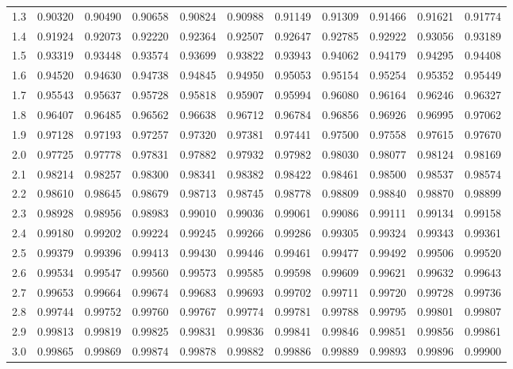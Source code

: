 \begin{center}
\begin{tabular}{c|cccccccccc}
1.3 & 0.90320 & 0.90490 & 0.90658 & 0.90824 & 0.90988 & 0.91149 & 0.91309 & 0.91466 & 0.91621 & 0.91774 \\
1.4 & 0.91924 & 0.92073 & 0.92220 & 0.92364 & 0.92507 & 0.92647 & 0.92785 & 0.92922 & 0.93056 & 0.93189 \\
1.5 & 0.93319 & 0.93448 & 0.93574 & 0.93699 & 0.93822 & 0.93943 & 0.94062 & 0.94179 & 0.94295 & 0.94408 \\
1.6 & 0.94520 & 0.94630 & 0.94738 & 0.94845 & 0.94950 & 0.95053 & 0.95154 & 0.95254 & 0.95352 & 0.95449 \\
1.7 & 0.95543 & 0.95637 & 0.95728 & 0.95818 & 0.95907 & 0.95994 & 0.96080 & 0.96164 & 0.96246 & 0.96327 \\
1.8 & 0.96407 & 0.96485 & 0.96562 & 0.96638 & 0.96712 & 0.96784 & 0.96856 & 0.96926 & 0.96995 & 0.97062 \\
1.9 & 0.97128 & 0.97193 & 0.97257 & 0.97320 & 0.97381 & 0.97441 & 0.97500 & 0.97558 & 0.97615 & 0.97670 \\
2.0 & 0.97725 & 0.97778 & 0.97831 & 0.97882 & 0.97932 & 0.97982 & 0.98030 & 0.98077 & 0.98124 & 0.98169 \\
2.1 & 0.98214 & 0.98257 & 0.98300 & 0.98341 & 0.98382 & 0.98422 & 0.98461 & 0.98500 & 0.98537 & 0.98574 \\
2.2 & 0.98610 & 0.98645 & 0.98679 & 0.98713 & 0.98745 & 0.98778 & 0.98809 & 0.98840 & 0.98870 & 0.98899 \\
2.3 & 0.98928 & 0.98956 & 0.98983 & 0.99010 & 0.99036 & 0.99061 & 0.99086 & 0.99111 & 0.99134 & 0.99158 \\
2.4 & 0.99180 & 0.99202 & 0.99224 & 0.99245 & 0.99266 & 0.99286 & 0.99305 & 0.99324 & 0.99343 & 0.99361 \\
2.5 & 0.99379 & 0.99396 & 0.99413 & 0.99430 & 0.99446 & 0.99461 & 0.99477 & 0.99492 & 0.99506 & 0.99520 \\
2.6 & 0.99534 & 0.99547 & 0.99560 & 0.99573 & 0.99585 & 0.99598 & 0.99609 & 0.99621 & 0.99632 & 0.99643 \\
2.7 & 0.99653 & 0.99664 & 0.99674 & 0.99683 & 0.99693 & 0.99702 & 0.99711 & 0.99720 & 0.99728 & 0.99736 \\
2.8 & 0.99744 & 0.99752 & 0.99760 & 0.99767 & 0.99774 & 0.99781 & 0.99788 & 0.99795 & 0.99801 & 0.99807 \\
2.9 & 0.99813 & 0.99819 & 0.99825 & 0.99831 & 0.99836 & 0.99841 & 0.99846 & 0.99851 & 0.99856 & 0.99861 \\
3.0 & 0.99865 & 0.99869 & 0.99874 & 0.99878 & 0.99882 & 0.99886 & 0.99889 & 0.99893 & 0.99896 & 0.99900 \\

\end{tabular}
\end{center}
